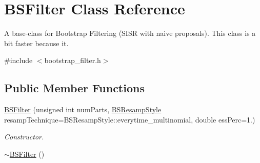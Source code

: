 \hypertarget{classBSFilter}{}\section{B\+S\+Filter Class Reference}
\label{classBSFilter}


A base-\/class for Bootstrap Filtering (S\+I\+SR with naive proposals). This class is a bit faster because it.  




{\ttfamily \#include $<$bootstrap\+\_\+filter.\+h$>$}

\subsection*{Public Member Functions}
\begin{DoxyCompactItemize}
\item 
\hyperlink{classBSFilter_ae10863380da750be1a5d506483743353}{B\+S\+Filter} (unsigned int num\+Parts, \hyperlink{bootstrap__filter_8h_a476b3b5754056a34ac843629c9570b49}{B\+S\+Resamp\+Style} resamp\+Technique=B\+S\+Resamp\+Style\+::everytime\+\_\+multinomial, double ess\+Perc=1.)
\begin{DoxyCompactList}\small\item\em Constructor. \end{DoxyCompactList}\item 
\hyperlink{classBSFilter_aff30bee4608cadfda7dd49a0d57bb39c}{$\sim$\+B\+S\+Filter} ()\hypertarget{classBSFilter_aff30bee4608cadfda7dd49a0d57bb39c}{}\label{classBSFilter_aff30bee4608cadfda7dd49a0d57bb39c}


\end{DoxyCompactItemize}
